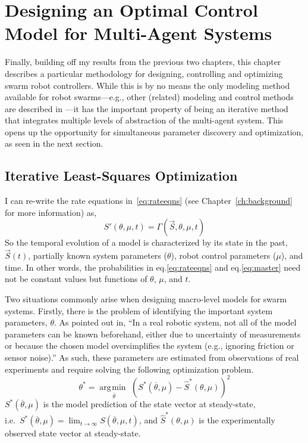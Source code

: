 \documentclass[defaultstyle,12pt]{proposal}
\DeclareMathOperator*{\argmin}{\arg\!\min\>}
\begin{document}
\chapter{Designing an Optimal Control Model for Multi-Agent Systems}\label{ch:optimization}
Finally, building off my results from the previous two chapters, this chapter describes a particular methodology for designing, controlling and optimizing swarm robot controllers. While this is by no means the only modeling method available for robot swarms---e.g., other (related) modeling and control methods are described in \cite{Bayazit2005,Berman2007,Billard1999,Sugawara2013}---it has the important property of being an iterative method that integrates multiple levels of abstraction of the multi-agent system. This opens up the opportunity for simultaneous parameter discovery and optimization, as seen in the next section.

\section{Iterative Least-Squares Optimization}\label{sec:opt}
I can re-write the rate equations in~\eqref{eq:rateeqns} (see Chapter~\ref{ch:background} for more information) as,
\begin{equation}
S'(\theta,\mu,t) = \Gamma\left(\vec{S}, \theta, \mu, t\right)
\end{equation}
So the temporal evolution of a model is characterized by its state in the past, $\vec{S}(t)$, partially known system parameters ($\theta$), robot control parameters ($\mu$), and time. In other words, the probabilities in eq.\eqref{eq:rateeqns} and eq.\eqref{eq:master} need not be constant values but functions of $\theta$, $\mu$, and $t$.

Two situations commonly arise when designing macro-level models for swarm systems. Firstly, there is the problem of identifying the important system parameters, $\theta$. As pointed out in\cite{Correll2008}, ``In a real robotic system, not all of the model parameters can be known beforehand, either due to uncertainty of measurements or because the chosen model oversimplifies the system (e.g., ignoring friction or sensor noise).'' As such, these parameters are estimated from observations of real experiments and require solving the following optimization problem.
\begin{equation}
	\theta^* = \underset{\overline{\theta}}{\argmin}\left(S^*(\overline{\theta},\mu) - \hat{S}^*(\theta, \mu)\right)^2 \label{eq:thetaopt}
\end{equation}
$S^*(\overline{\theta},\mu)$ is the model prediction of the state vector at steady-state,\\ i.e.~$S^*(\overline{\theta},\mu) = \lim_{t \to \infty}S(\overline{\theta},\mu, t)$, and $\hat{S}^*(\theta, \mu)$ is the experimentally observed state vector at steady-state.
\end{document}
